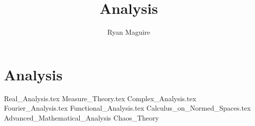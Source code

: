 \documentclass[crop=false,class=book,oneside]{standalone}
\begin{document}
    \newif\ifmathcourses
    \ifx\ifmain\undefined
        \title{Analysis}
        \author{Ryan Maguire}
        \date{\vspace{-5ex}}
        \maketitle
        \tableofcontents
        \listoffigures
        \listoftables
        \clearpage
    \fi
    \part{Analysis}
        {Real_Analysis.tex}
        {Measure_Theory.tex}
        {Complex_Analysis.tex}
        {Fourier_Analysis.tex}
        {Functional_Analysis.tex}
        {Calculus_on_Normed_Spaces.tex}
        {Advanced_Mathematical_Analysis}
        {Chaos_Theory}
\end{document}
